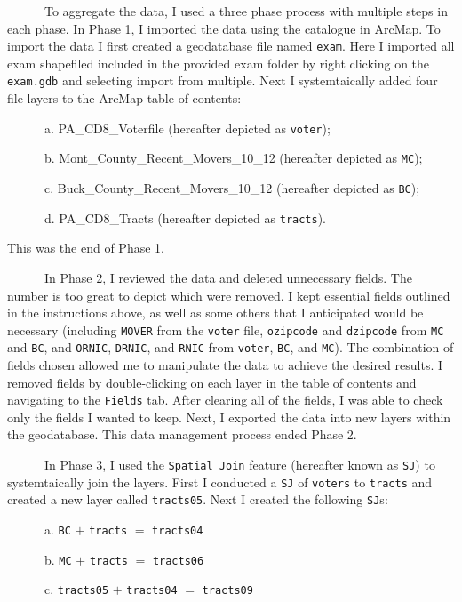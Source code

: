 \documentclass[]{article}
\begin{document}
~~~~~~To aggregate the data, I used a three phase process with multiple
steps in each phase. In Phase 1, I imported the data using the catalogue
in ArcMap. To import the data I first created a geodatabase file named
\texttt{exam}. Here I imported all exam shapefiled included in the
provided exam folder by right clicking on the \texttt{exam.gdb} and
selecting import from multiple. Next I systemtaically added four file
layers to the ArcMap table of contents:

~~~~~~a. PA\_CD8\_Voterfile (hereafter depicted as \texttt{voter});

~~~~~~b. Mont\_County\_Recent\_Movers\_10\_12 (hereafter depicted as
\texttt{MC});

~~~~~~c. Buck\_County\_Recent\_Movers\_10\_12 (hereafter depicted as
\texttt{BC});

~~~~~~d. PA\_CD8\_Tracts (hereafter depicted as \texttt{tracts}).

This was the end of Phase 1.

~~~~~~In Phase 2, I reviewed the data and deleted unnecessary fields.
The number is too great to depict which were removed. I kept essential
fields outlined in the instructions above, as well as some others that I
anticipated would be necessary (including \texttt{MOVER} from the
\texttt{voter} file, \texttt{ozipcode} and \texttt{dzipcode} from
\texttt{MC} and \texttt{BC}, and \texttt{ORNIC}, \texttt{DRNIC}, and
\texttt{RNIC} from \texttt{voter}, \texttt{BC}, and \texttt{MC}). The
combination of fields chosen allowed me to manipulate the data to
achieve the desired results. I removed fields by double-clicking on each
layer in the table of contents and navigating to the \texttt{Fields}
tab. After clearing all of the fields, I was able to check only the
fields I wanted to keep. Next, I exported the data into new layers
within the geodatabase. This data management process ended Phase 2.

~~~~~~In Phase 3, I used the \texttt{Spatial\ Join} feature (hereafter
known as \texttt{SJ}) to systemtaically join the layers. First I
conducted a \texttt{SJ} of \texttt{voters} to \texttt{tracts} and
created a new layer called \texttt{tracts05}. Next I created the
following \texttt{SJ}s:

~~~~~~a. \texttt{BC} \(+\) \texttt{tracts} \(=\) \texttt{tracts04}

~~~~~~b. \texttt{MC} \(+\) \texttt{tracts} \(=\) \texttt{tracts06}

~~~~~~c. \texttt{tracts05} \(+\) \texttt{tracts04} \(=\)
\texttt{tracts09}
\end{document}
